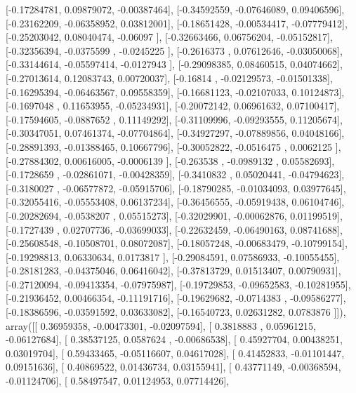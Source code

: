 \documentclass{article}
\begin{document}
       [-0.17284781,  0.09879072, -0.00387464],
       [-0.34592559, -0.07646089,  0.09406596],
       [-0.23162209, -0.06358952,  0.03812001],
       [-0.18651428, -0.00534417, -0.07779412],
       [-0.25203042,  0.08040474, -0.06097   ],
       [-0.32663466,  0.06756204, -0.05152817],
       [-0.32356394, -0.0375599 , -0.0245225 ],
       [-0.2616373 ,  0.07612646, -0.03050068],
       [-0.33144614, -0.05597414, -0.0127943 ],
       [-0.29098385,  0.08460515,  0.04074662],
       [-0.27013614,  0.12083743,  0.00720037],
       [-0.16814   , -0.02129573, -0.01501338],
       [-0.16295394, -0.06463567,  0.09558359],
       [-0.16681123, -0.02107033,  0.10124873],
       [-0.1697048 ,  0.11653955, -0.05234931],
       [-0.20072142,  0.06961632,  0.07100417],
       [-0.17594605, -0.0887652 ,  0.11149292],
       [-0.31109996, -0.09293555,  0.11205674],
       [-0.30347051,  0.07461374, -0.07704864],
       [-0.34927297, -0.07889856,  0.04048166],
       [-0.28891393, -0.01388465,  0.10667796],
       [-0.30052822, -0.0516475 ,  0.0062125 ],
       [-0.27884302,  0.00616005, -0.0006139 ],
       [-0.263538  , -0.0989132 ,  0.05582693],
       [-0.1728659 , -0.02861071, -0.00428359],
       [-0.3410832 ,  0.05020441, -0.04794623],
       [-0.3180027 , -0.06577872, -0.05915706],
       [-0.18790285, -0.01034093,  0.03977645],
       [-0.32055416, -0.05553408,  0.06137234],
       [-0.36456555, -0.05919438,  0.06104746],
       [-0.20282694, -0.0538207 ,  0.05515273],
       [-0.32029901, -0.00062876,  0.01199519],
       [-0.1727439 ,  0.02707736, -0.03699033],
       [-0.22632459, -0.06490163,  0.08741688],
       [-0.25608548, -0.10508701,  0.08072087],
       [-0.18057248, -0.00683479, -0.10799154],
       [-0.19298813,  0.06330634,  0.0173817 ],
       [-0.29084591,  0.07586933, -0.10055455],
       [-0.28181283, -0.04375046,  0.06416042],
       [-0.37813729,  0.01513407,  0.00790931],
       [-0.27120094, -0.09413354, -0.07975987],
       [-0.19729853, -0.09652583, -0.10281955],
       [-0.21936452,  0.00466354, -0.11191716],
       [-0.19629682, -0.0714383 , -0.09586277],
       [-0.18386596, -0.03591592,  0.03633082],
       [-0.16540723,  0.02631282,  0.0783876 ]]), array([[ 0.36959358, -0.00473301, -0.02097594],
       [ 0.3818883 ,  0.05961215, -0.06127684],
       [ 0.38537125,  0.0587624 , -0.00686538],
       [ 0.45927704,  0.00438251,  0.03019704],
       [ 0.59433465, -0.05116607,  0.04617028],
       [ 0.41452833, -0.01101447,  0.09151636],
       [ 0.40869522,  0.01436734,  0.03155941],
       [ 0.43771149, -0.00368594, -0.01124706],
       [ 0.58497547,  0.01124953,  0.07714426],
\end{document}
